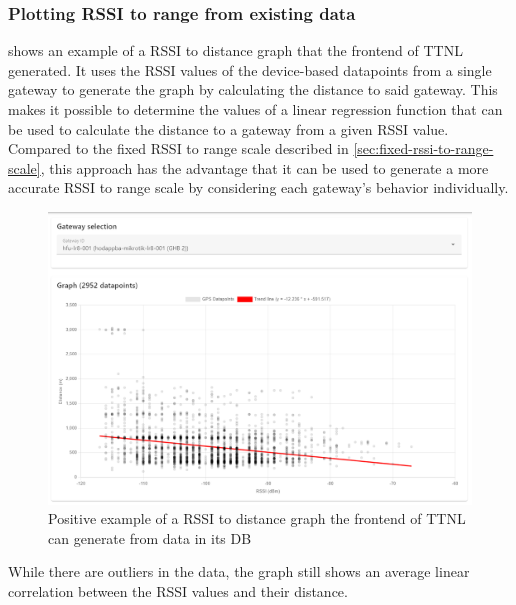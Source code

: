 
\subsubsection{Plotting \acs{RSSI} to range from existing data}


 shows an example of a \ac{RSSI} to distance graph that the frontend of \ac{TTNL} generated.
It uses the \ac{RSSI} values of the device-based datapoints from a single gateway to generate the graph by calculating the distance to said gateway.
This makes it possible to determine the values of a linear regression function that can be used to calculate the distance to a gateway from a given \ac{RSSI} value.
Compared to the fixed \ac{RSSI} to range scale described in \cref{sec:fixed-rssi-to-range-scale}, this approach has the advantage that it can be used to generate a more accurate \ac{RSSI} to range scale by considering each gateway's behavior individually.

\begin{figure}
    \centering
    \includegraphics[width=1\textwidth]{pictures/ttn-locator/frontend/data/gateway_ghb_rssi_range_graph.png}
    \caption{Positive example of a \ac{RSSI} to distance graph the frontend of \ac{TTNL} can generate from data in its \ac{DB}\label{fig:rssi-range-graph-example}}
\end{figure}

While there are outliers in the data, the graph still shows an average linear correlation between the \ac{RSSI} values and their distance.

